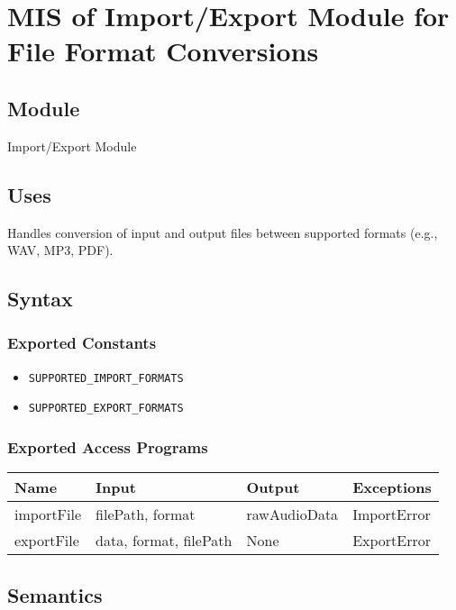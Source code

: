 \documentclass[12pt, titlepage]{article}
\begin{document}
\section{MIS of Import/Export Module for File Format Conversions} \label{M6}  

\subsection{Module}  
Import/Export Module  

\subsection{Uses}  
Handles conversion of input and output files between supported formats (e.g., WAV, MP3, PDF).  

\subsection{Syntax}  

\subsubsection{Exported Constants}  
\begin{itemize}
    \item \texttt{SUPPORTED\_IMPORT\_FORMATS}  
    \item \texttt{SUPPORTED\_EXPORT\_FORMATS}  
\end{itemize}  

\subsubsection{Exported Access Programs}  
\begin{center}  
\begin{tabular}{|p{3cm}|p{4cm}|p{4cm}|p{3cm}|}  
\hline  
\textbf{Name} & \textbf{Input} & \textbf{Output} & \textbf{Exceptions} \\  
\hline  
importFile & filePath, format & rawAudioData & ImportError \\  
exportFile & data, format, filePath & None & ExportError \\  
\hline  
\end{tabular}  
\end{center}  

\subsection{Semantics}  
\end{document}
